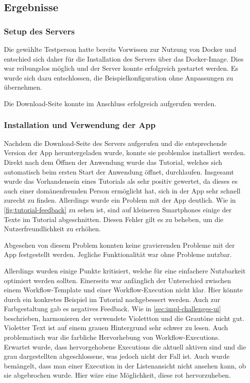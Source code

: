 \subsection{Ergebnisse}

\subsubsection{Setup des Servers}

Die gewählte Testperson hatte bereits Vorwissen zur Nutzung von Docker und entschied sich daher für
die Installation des Servers über das Docker-Image. Dies war reibungslos möglich und der Server konnte
erfolgreich gestartet werden. Es wurde sich dazu entschlossen, die Beispielkonfiguration ohne
Anpassungen zu übernehmen.

Die Download-Seite konnte im Anschluss erfolgreich aufgerufen werden.

\subsubsection{Installation und Verwendung der App}

Nachdem die Download-Seite des Servers aufgerufen und die entsprechende Version der App
heruntergeladen wurde, konnte sie problemlos installiert werden.
Direkt nach dem Öffnen der Anwendung wurde das Tutorial, welches sich automatisch beim ersten Start
der Anwendung öffnet, durchlaufen.
Insgesamt wurde das Vorhandensein eines Tutorials als sehr positiv gewertet, da dieses es auch einer
domänenfremden Person ermöglicht hat, sich in der App sehr schnell zurecht zu finden. Allerdings
wurde ein Problem mit der App deutlich. Wie in \autoref{fig:tutorial-feedback} zu sehen ist, sind
auf kleineren Smartphones einige der Texte im Tutorial abgeschnitten. Diesen Fehler gilt es zu
beheben, um die Nutzerfreundlichkeit zu erhöhen.

Abgesehen von diesem Problem konnten keine gravierenden Probleme mit der App festgestellt werden.
Jegliche Funktionalität war ohne Probleme nutzbar.

Allerdings wurden einige Punkte kritisiert, welche für eine einfachere Nutzbarkeit optimiert
werden sollten.
Einerseits war anfänglich der Unterschied zwischen einem Workflow-Template und einer
Workflow-Execution nicht klar. Hier könnte durch ein konkretes Beispiel im Tutorial nachgebessert
werden. Auch zur Farbgestaltung gab es negatives Feedback. Wie in \autoref{sec:impl-challenges-ui}
beschrieben, harmonieren der verwendete Violettton und die Grautöne nicht gut. Violetter Text
ist auf einem grauen Hintergrund sehr schwer zu lesen. Auch problematisch war die farbliche
Hervorhebung von Workflow-Executions. Erwartet wurde, dass hervorgehobene Executions die aktuell
aktiven sind und die grau dargestellten abgeschlossene, was jedoch nicht der Fall ist. Auch wurde
bemängelt, dass man einer Execution in der Listenansicht nicht ansehen kann, ob sie abgebrochen
wurde. Hier wäre eine Möglichkeit, diese rot hervorzuheben.


